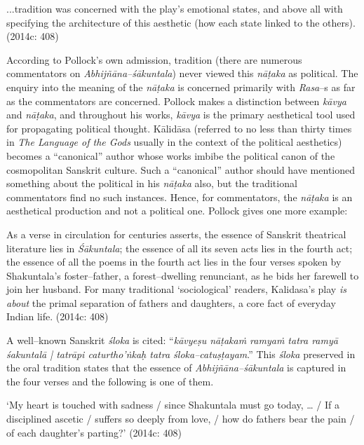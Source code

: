 \vspace{-.4cm}

\begin{myquote}
...tradition was concerned with the play’s emotional states, and above all with specifying the architecture of this aesthetic (how each state linked to the others). (2014c: 408)
\end{myquote}

According to Pollock’s own admission, tradition (there are numerous commentators on \textit{Abhijñāna–śākuntala}) never viewed this \textit{nāṭaka }as political. The enquiry into the meaning of the \textit{nāṭaka }is concerned primarily with \textit{Rasa}–s as far as the commentators are concerned. Pollock makes a distinction between \textit{kāvya} and \textit{nāṭaka}, and throughout his works,\textit{ kāvya }is the primary aesthetical tool used for propagating political thought. Kālidāsa (referred to no less than thirty times in \textit{The Language of the Gods} usually in the context of the political aesthetics) becomes a “canonical” author whose works imbibe the political canon of the cosmopolitan Sanskrit culture. Such a “canonical” author should have mentioned something about the political in his \textit{nāṭaka }also, but the traditional commentators find no such instances. Hence, for commentators, the \textit{nāṭaka }is an aesthetical production and not a political one. Pollock gives one more example:

\begin{myquote}
As a verse in circulation for centuries asserts, the essence of Sanskrit theatrical literature lies in \textit{Śākuntala}; the essence of all its seven acts lies in the fourth act; the essence of all the poems in the fourth act lies in the four verses spoken by Shakuntala’s foster–father, a forest–dwelling renunciant, as he bids her farewell to join her husband. For many traditional ‘sociological’ readers, Kalidasa’s play \textit{is about} the primal separation of fathers and daughters, a core fact of everyday Indian life. (2014c: 408)
\end{myquote}

A well–known Sanskrit \textit{śloka} is cited: “\textit{kāvyeṣu nāṭakaṁ ramyaṁ tatra ramyā śakuntalā | tatrāpi caturtho'ṅkaḥ tatra śloka–catuṣṭayam}.” This \textit{śloka} preserved in the oral tradition states that the essence of \textit{Abhijñāna–śākuntala }is captured in the four verses and the following is one of them.

\begin{myquote}
‘My heart is touched with sadness / since Shakuntala must go today, … / If a disciplined ascetic / suffers so deeply from love, / how do fathers bear the pain / of each daughter’s parting?’ (2014c: 408)
\end{myquote}

